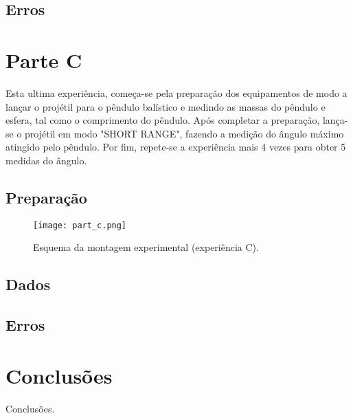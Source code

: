 \documentclass{report}
\begin{document}
\section{Erros}

\chapter{Parte C}

	Esta ultima experiência, começa-se pela preparação dos equipamentos de modo a lançar o projétil 
	para o pêndulo balístico e medindo as massas do pêndulo e esfera, tal como o comprimento do pêndulo.
	Após completar a preparação, lança-se o projétil em modo "SHORT RANGE", fazendo a medição do ângulo 
	máximo atingido pelo pêndulo. Por fim, repete-se a experiência mais 4 vezes para obter 5 medidas do ângulo.

\section{Preparação}
\begin{figure}
	\centering
	\texttt{[image: part\_c.png]}
	\caption{Esquema da montagem experimental (experiência C).}
\end{figure}

\section{Dados}

\section{Erros}

\chapter{Conclusões}
Conclusões.
\end{document}
